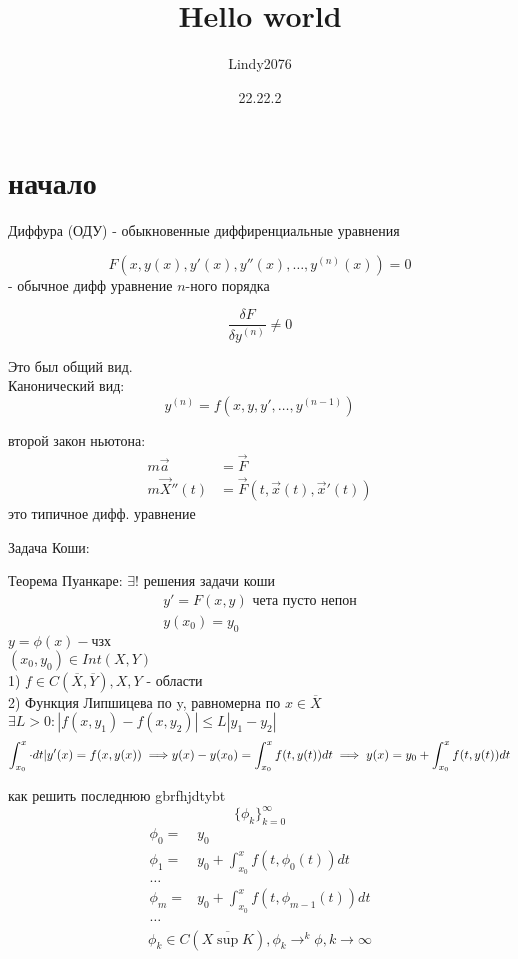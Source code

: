 \documentclass[12pt, a4paper]{article}
\title{Hello world}
\author{Lindy2076}
\date{22.22.2} %
\begin{document}
\section{начало}

	Диффура (ОДУ) - обыкновенные диффиренциальные уравнения
	
	$$F(x, y(x), y'(x), y''(x), \dotsc, y^{(n)}(x)) = 0$$ - обычное дифф уравнение $n$-ного порядка
	
	$$\frac{\delta F}{\delta y^{(n)}} \neq 0$$

Это был общий вид.\\
Канонический вид:
$$y^{(n)} = f(x,y,y',\dotsc,y^{(n-1)})$$

второй закон ньютона: 
\begin{align}
m\vec{a} &= \vec{F} \\
m\vec{X}''(t) &= \vec{F}(t, \vec{x}(t), \vec{x}'(t))
\end{align}
это типичное дифф. уравнение

Задача Коши:



Теорема Пуанкаре: $\exists!$ решения задачи коши
$$\begin{matrix}
	y' = F(x,y) \text{ чета пусто непон}\\
	y(x_0) = y_0
\end{matrix}$$
$ y = \phi(x) - \text{чзх}$\\
$(x_0, y_0) \in Int(X, Y)$\\
1) $f \in C(\overline{X}, \overline{Y}), X, Y$ - области \\
2) Функция Липшицева по y, равномерна по $x \in \overline{X}$
$\exists L>0: | f(x,y_1) - f(x,y_2)| \le L |y_1-y_2|$\\

$$\int^{x}_{x_0} \cdot dt | y'(x) = f(x, y(x)) \implies \\ y(x)-y(x_0) = \int^x_{x_0} f(t, y(t))dt \implies y(x) = y_0 + \int^x_{x_0}f(t,y(t))dt$$

как решить последнюю 
gbrfhjdtybt
$$\{\phi_k\}^\infty_{k=0}$$
$$
\begin{matrix}
\phi_0 =& y_0 \\
\phi_1 =& y_0 + \int^x_{x_0}f(t, \phi_0(t))dt \\
\dotsc \\
\phi_m =& y_0 + \int^x_{x_0}f(t, \phi_{m-1}(t))dt \\
\dotsc \\
\end{matrix}$$
$$ \phi_k \in C(\overline{X \sup K}), \phi_k \rightarrow^k \phi, k\to\infty
$$
\end{document}
